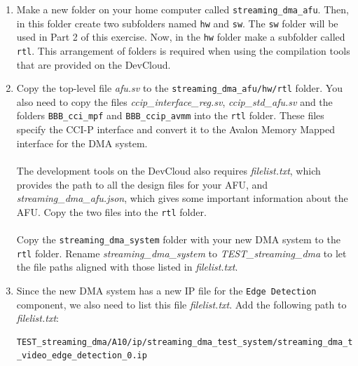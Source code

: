 \documentclass[epsfig,10pt,fullpage]{article}
\begin{document}
\begin{enumerate}
\item
Make a new folder on your home computer called \texttt{streaming\_dma\_afu}. Then, in this folder create two subfolders named \texttt{hw} and \texttt{sw}. The \texttt{sw} folder will be used in Part 2 of this exercise. Now, in the \texttt{hw} folder make a subfolder called \texttt{rtl}. This arrangement of folders is required when using the compilation tools that are provided on the DevCloud.

\item Copy the top-level file {\it afu.sv} to the \texttt{streaming\_dma\_afu/hw/rtl} folder. You also need to copy the files {\it ccip\_interface\_reg.sv}, {\it ccip\_std\_afu.sv} and the folders \texttt{BBB\_cci\_mpf} and \texttt{BBB\_ccip\_avmm} into the \texttt{rtl} folder. These files specify the CCI-P interface and convert it to the Avalon Memory Mapped interface for the DMA system.\\
\\
The development tools on the DevCloud also requires {\it filelist.txt}, which provides the path to all the design files for your AFU, and {\it streaming\_dma\_afu.json}, which gives some important information about the AFU. Copy the two files into the \texttt{rtl} folder.\\
\\
Copy the \texttt{streaming\_dma\_system} folder with your new DMA system to the \texttt{rtl} folder. Rename {\it streaming\_dma\_system} to {\it TEST\_streaming\_dma} to let the file paths aligned with those listed in {\it filelist.txt}.

\item Since the new DMA system has a new IP file for the \texttt{Edge Detection} component, we also need to list this file {\it filelist.txt}. Add the following path to {\it filelist.txt}:
\begin{lstlisting}
TEST_streaming_dma/A10/ip/streaming_dma_test_system/streaming_dma_test_system
_video_edge_detection_0.ip
\end{lstlisting}


\end{enumerate}
\end{document}
